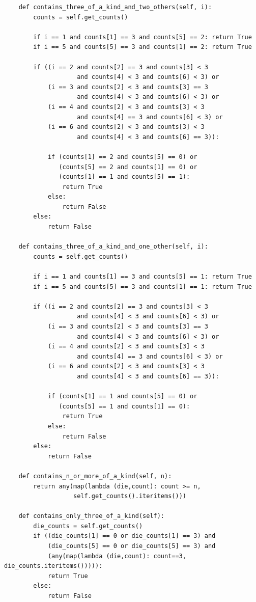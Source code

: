 \documentclass{article}
\begin{document}
\begin{lstlisting}
    def contains_three_of_a_kind_and_two_others(self, i):
        counts = self.get_counts()

        if i == 1 and counts[1] == 3 and counts[5] == 2: return True
        if i == 5 and counts[5] == 3 and counts[1] == 2: return True

        if ((i == 2 and counts[2] == 3 and counts[3] < 3
                    and counts[4] < 3 and counts[6] < 3) or
            (i == 3 and counts[2] < 3 and counts[3] == 3
                    and counts[4] < 3 and counts[6] < 3) or
            (i == 4 and counts[2] < 3 and counts[3] < 3
                    and counts[4] == 3 and counts[6] < 3) or
            (i == 6 and counts[2] < 3 and counts[3] < 3
                    and counts[4] < 3 and counts[6] == 3)):

            if (counts[1] == 2 and counts[5] == 0) or
               (counts[5] == 2 and counts[1] == 0) or
               (counts[1] == 1 and counts[5] == 1):
                return True
            else:
                return False
        else:
            return False

    def contains_three_of_a_kind_and_one_other(self, i):
        counts = self.get_counts()

        if i == 1 and counts[1] == 3 and counts[5] == 1: return True
        if i == 5 and counts[5] == 3 and counts[1] == 1: return True

        if ((i == 2 and counts[2] == 3 and counts[3] < 3
                    and counts[4] < 3 and counts[6] < 3) or
            (i == 3 and counts[2] < 3 and counts[3] == 3
                    and counts[4] < 3 and counts[6] < 3) or
            (i == 4 and counts[2] < 3 and counts[3] < 3
                    and counts[4] == 3 and counts[6] < 3) or
            (i == 6 and counts[2] < 3 and counts[3] < 3
                    and counts[4] < 3 and counts[6] == 3)):

            if (counts[1] == 1 and counts[5] == 0) or
               (counts[5] == 1 and counts[1] == 0):
                return True
            else:
                return False
        else:
            return False

    def contains_n_or_more_of_a_kind(self, n):
        return any(map(lambda (die,count): count >= n,
                   self.get_counts().iteritems()))

    def contains_only_three_of_a_kind(self):
        die_counts = self.get_counts()
        if ((die_counts[1] == 0 or die_counts[1] == 3) and
            (die_counts[5] == 0 or die_counts[5] == 3) and 
            (any(map(lambda (die,count): count==3, die_counts.iteritems())))):
            return True
        else:
            return False


\end{lstlisting}
\end{document}
